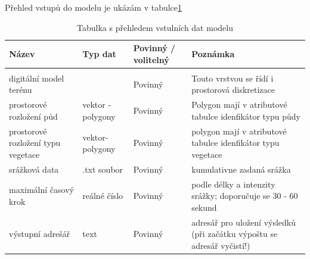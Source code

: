 Přehled vstupů do modelu je ukázám v tabulce\ref{tab:vstupy}
\begin{table}[]
\centering
\caption{Tabulka s přehledem vstulních dat modelu}
\label{tab:vstupy}
\small{
\begin{tabular}{p{4cm}lp{2cm}p{5cm}}
\hline
Název                              & Typ dat                                               & Povinný / volitelný & Poznámka                                                                                                                                                      \\ \hline \\ \hline
digitální model terénu             & \cellcolor[HTML]{96FFFB}{\color[HTML]{000000} raster} & Povinný           & Touto vrstvou se řídí i prostorová diskretizace                                                                                                               \\ \hline
prostorové rozložení půd           & \cellcolor[HTML]{FFC702}vektor - polygony             & Povinný           & Polygon mají v atributové tabulce idenfikátor typu půdy                                                                                                       \\ \hline
prostorové rozložení typu vegetace & \cellcolor[HTML]{FFC702}vektor- polygony              & Povinný           & polygon mají v atributové tabulce idenfikátor typu vegetace                                                                                                   \\ \hline
srážková data                      & .txt soubor                                           & Povinný           & kumulativne zadaná srážka                                                                                                                                     \\ \hline
maximální časový krok              & reálné číslo                                          & Povinný           & podle délky a intenzity srážky; doporučuje se 30 - 60 sekund                                                                                                  \\ \hline
výstupní adrešář                   & text                                                  & Povinný           & adresář pro uložení výsledků (při začátku výpoštu se adresář vyčistí!)                                                                                        \\ \hline

\end{tabular}}
\end{table}
